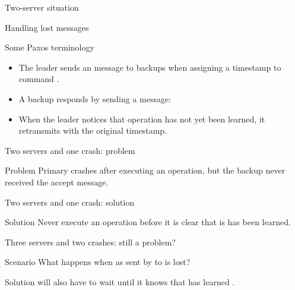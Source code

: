 \begin{slide}{Two-server situation}
  \begin{center}
  \end{center}
\end{slide}
\begin{slide}{Handling lost messages}
  \begin{block}{Some Paxos terminology}
    \begin{itemize}
    \item The leader sends an  message  to backups when assigning
      a timestamp  to command .
    \item A backup responds by sending a  message: 
    \item When the leader notices that operation  has not yet been learned, it retransmits
       with the original timestamp.
    \end{itemize}
  \end{block}
\end{slide}
\begin{slide}{Two servers and one crash: problem}
  \centering{}
  \begin{block}{Problem}
    Primary crashes after executing an operation, but the backup never received the accept message.
  \end{block}
\end{slide}
\begin{slide}{Two servers and one crash: solution}
  \centering{}
  \begin{block}{Solution}
    Never execute an operation before it is clear that is has been learned.
  \end{block}
\end{slide}
\begin{slide}{Three servers and two crashes: still a problem?}
  \begin{center}
  \end{center}
  \begin{exampleblock}{Scenario}
    What happens when  as sent by  to  is lost?
  \end{exampleblock}
  \begin{block}{Solution}
     will also have to wait until it knows that  has learned .
  \end{block}
\end{slide}
